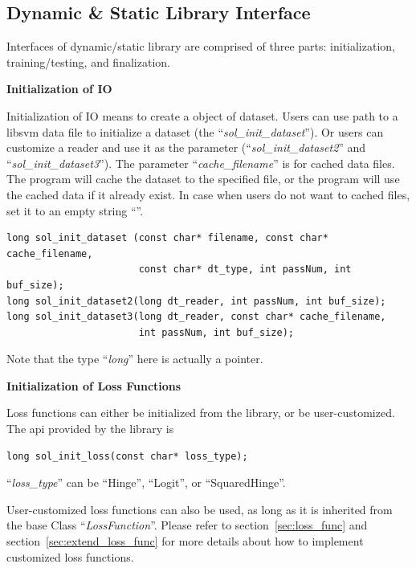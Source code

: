 \documentclass[11pt,a4paper]{article}
\begin{document}
\subsection{Dynamic \& Static Library Interface}
Interfaces of dynamic/static library are comprised of three parts:
initialization, training/testing, and finalization.

\hspace{-5mm}\textbf{Initialization of IO}
\vspace{2mm}

Initialization of IO means to create a object of dataset. Users can use 
path to a libsvm data file to initialize a dataset (the ``\emph{sol\_init\_dataset}''). Or users can customize a reader
and use it as the parameter (``\emph{sol\_init\_dataset2}'' and
``\emph{sol\_init\_dataset3}''). The parameter ``\emph{cache\_filename}'' is for
cached data files. The program will cache the dataset to the specified file, or
the program will use the cached data if it already exist. In case when users do
not want to cached files, set it to an empty string ``''.

\lstset{language=C++}
\begin{lstlisting}
long sol_init_dataset (const char* filename, const char* cache_filename, 
                       const char* dt_type, int passNum, int buf_size);
long sol_init_dataset2(long dt_reader, int passNum, int buf_size);
long sol_init_dataset3(long dt_reader, const char* cache_filename, 
                       int passNum, int buf_size);
\end{lstlisting}

Note that the type ``\emph{long}'' here is actually  a pointer.

\vspace{4mm}\hspace{-5mm}\textbf{Initialization of Loss Functions}
\vspace{2mm}

Loss functions can either be initialized from the library, or be
user-customized. The api provided by the library is
\lstset{language=C++}
\begin{lstlisting}
long sol_init_loss(const char* loss_type);
\end{lstlisting}
``\emph{loss\_type}'' can be ``Hinge'', ``Logit'', or ``SquaredHinge''.

User-customized loss functions can also be used, as long as it is inherited
from the base Class ``\emph{LossFunction}''. Please refer
to section~\ref{sec:loss_func} and section~\ref{sec:extend_loss_func} for more
details about how to implement customized loss functions.
\end{document}
